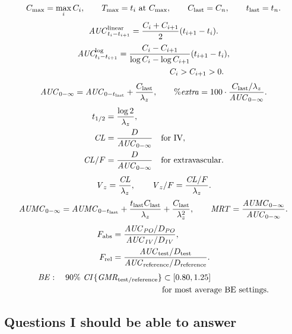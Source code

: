 \documentclass[a4paper]{article}
\newcommand{\CL}{\ensuremath{\pksym{CL}}}
\newcommand{\CLF}{\ensuremath{\pksym{CL}/F}}
\newcommand{\Vz}{\ensuremath{\pksym{V}_z}}
\newcommand{\VzF}{\ensuremath{\pksym{V}_z/F}}
\newcommand{\AUC}{\ensuremath{\pksym{AUC}}}
\newcommand{\AUClast}{\ensuremath{\pksym{AUC}_{0-t_{\pklab{last}}}}}
\newcommand{\AUCinf}{\ensuremath{\pksym{AUC}_{0-\infty}}}
\newcommand{\AUMClast}{\ensuremath{\pksym{AUMC}_{0-t_{\pklab{last}}}}}
\newcommand{\AUMCinf}{\ensuremath{\pksym{AUMC}_{0-\infty}}}
\newcommand{\MRT}{\ensuremath{\pksym{MRT}}}
\newcommand{\Cmax}{\ensuremath{C_{\pklab{max}}}}
\newcommand{\Tmax}{\ensuremath{T_{\pklab{max}}}}
\newcommand{\Clast}{\ensuremath{C_{\pklab{last}}}}
\newcommand{\Tlast}{\ensuremath{t_{\pklab{last}}}}
\newcommand{\lambdaZ}{\ensuremath{\lambda_z}}
\newcommand{\halfLife}{\ensuremath{t_{1/2}}}
\newcommand{\BE}{\ensuremath{\pksym{BE}}}
\newcommand{\IV}{\ensuremath{\pksym{IV}}}
\newcommand{\PO}{\ensuremath{\pksym{PO}}}
\newcommand{\GMR}{\ensuremath{\pksym{GMR}}}
\newcommand{\CI}{\ensuremath{\pksym{CI}}}
\begin{document}
\[
  \Cmax=\max_i C_i,
  \qquad
  \Tmax=t_i \text{ at } \Cmax,
  \qquad
  \Clast=C_n,
  \qquad
  \Tlast=t_n.
\]
\[
  \pksym{AUC}_{t_i-t_{i+1}}^{\pklab{linear}}
  =
  \frac{C_i+C_{i+1}}{2}(t_{i+1}-t_i).
\]
\[
\begin{aligned}
  \pksym{AUC}_{t_i-t_{i+1}}^{\pklab{log}}
  &=
  \frac{C_i-C_{i+1}}{\log C_i-\log C_{i+1}}(t_{i+1}-t_i),\\
  &\hspace{2.2cm} C_i>C_{i+1}>0.
\end{aligned}
\]
\[
  \AUCinf=\AUClast+\frac{\Clast}{\lambdaZ},
  \qquad
  \%\pksym{extra}=100\cdot\frac{\Clast/\lambdaZ}{\AUCinf}.
\]
\[
\begin{aligned}
  \halfLife&=\frac{\log 2}{\lambdaZ},\\
  \CL&=\frac{D}{\AUCinf}\quad \text{for IV},\\
  \CLF&=\frac{D}{\AUCinf}\quad \text{for extravascular}.
\end{aligned}
\]
\[
  \Vz=\frac{\CL}{\lambdaZ},
  \qquad
  \VzF=\frac{\CLF}{\lambdaZ}.
\]
\[
  \AUMCinf
  =
  \AUMClast
  +
  \frac{\Tlast\Clast}{\lambdaZ}
  +
  \frac{\Clast}{\lambdaZ^2},
  \qquad
  \MRT=\frac{\AUMCinf}{\AUCinf}.
\]
\[
\begin{aligned}
  F_{\pklab{abs}}
  &=
  \frac{\AUC_{\PO}/D_{\PO}}{\AUC_{\IV}/D_{\IV}},\\
  F_{\pklab{rel}}
  &=
  \frac{\AUC_{\pklab{test}}/D_{\pklab{test}}}
       {\AUC_{\pklab{reference}}/D_{\pklab{reference}}}.
\end{aligned}
\]
\[
\begin{aligned}
  \BE:\quad
  90\%\ \CI\{\GMR_{\pklab{test/reference}}\}
  &\subset [0.80,1.25]\\
  &\text{for most average BE settings.}
\end{aligned}
\]

\subsection{Questions I should be able to answer}
\end{document}
